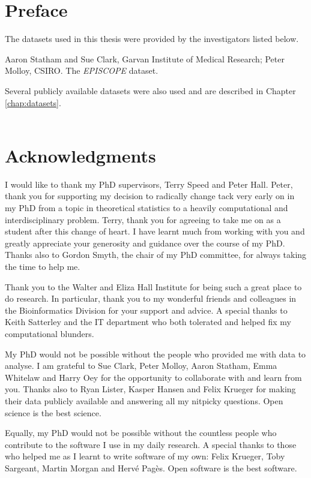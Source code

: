 \documentclass[11pt,a4paper,oneside]{book}	%
\begin{document}
\chapter{Preface}

The datasets used in this thesis were provided by the investigators listed below.

Aaron Statham and Sue Clark, Garvan Institute of Medical Research; Peter Molloy, CSIRO. The \emph{EPISCOPE} dataset.

Several publicly available datasets were also used and are described in Chapter \ref{chap:datasets}.\\\\

\chapter{Acknowledgments}

I would like to thank my PhD supervisors, Terry Speed and  Peter Hall. Peter, thank you for supporting my decision to radically change tack very early on in my PhD from a topic in theoretical statistics to a heavily computational and interdisciplinary problem. Terry, thank you for agreeing to take me on as a student after this change of heart. I have learnt much from working with you and greatly appreciate your generosity and guidance over the course of my PhD. Thanks also to Gordon Smyth, the chair of my PhD committee, for always taking the time to help me.

Thank you to the Walter and Eliza Hall Institute for being such a great place to do research. In particular, thank you to my wonderful friends and colleagues in the Bioinformatics Division for your support and advice. A special thanks to Keith Satterley and the IT department who both tolerated and helped fix my computational blunders.

My PhD would not be possible without the people who provided me with data to analyse. I am grateful to Sue Clark, Peter Molloy, Aaron Statham, Emma Whitelaw and Harry Oey for the opportunity to collaborate with and learn from you. Thanks also to Ryan Lister, Kasper Hansen and Felix Krueger for making their data publicly available and answering all my nitpicky questions. Open science is the best science.

Equally, my PhD would not be possible without the countless people who contribute to the software I use in my daily research. A special thanks to those who helped me as I learnt to write software of my own: Felix Krueger, Toby Sargeant, Martin Morgan and Hervé Pagès. Open software is the best software.
\end{document}
